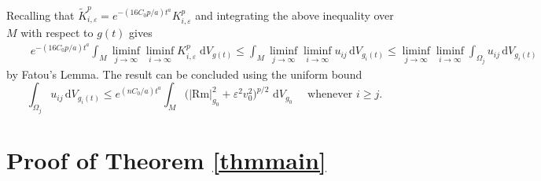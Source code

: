 \documentclass{amsart}
\theoremstyle{definition}
\newcommand{\dV}{\mathrm{d}V}
\begin{document}
Recalling that $\widetilde K_{i,\varepsilon}^p=e^{-(16C_0p/a)t^{a}}K_{i,\varepsilon}^p$ and integrating the above inequality over $M$ with respect to $g(t)$ gives
\[
    \begin{split}
&\quad e^{-(16C_0p/a)t^{a}}\int_M \liminf_{j\to \infty}\liminf_{i\to \infty} K_{i,\varepsilon}^p \;\dV_{g(t)}\leq
\int_M \liminf_{j\to \infty}\liminf_{i\to \infty} u_{ij}\,\dV_{g_i(t)}\leq
\liminf_{j\to \infty}\liminf_{i\to \infty}\int_{\Omega_j}  u_{ij}\,\dV_{g_i(t)}
\end{split}
\]
by Fatou's Lemma. The result can be concluded using the uniform bound
\[
    \int_{\Omega_j} u_{ij} \,\dV_{g_i(t)}\leq e^{(nC_0/a)t^{a}}\int_M \bigl(|\mathrm{Rm}|^2_{g_0} + \varepsilon^2 v_0^2\bigr)^{p/2} \, \,\dV_{g_0} \quad \text{ whenever } i\geq j.
\]



\section{Proof of Theorem \ref{thmmain}}\label{SectionProof}
\end{document}
